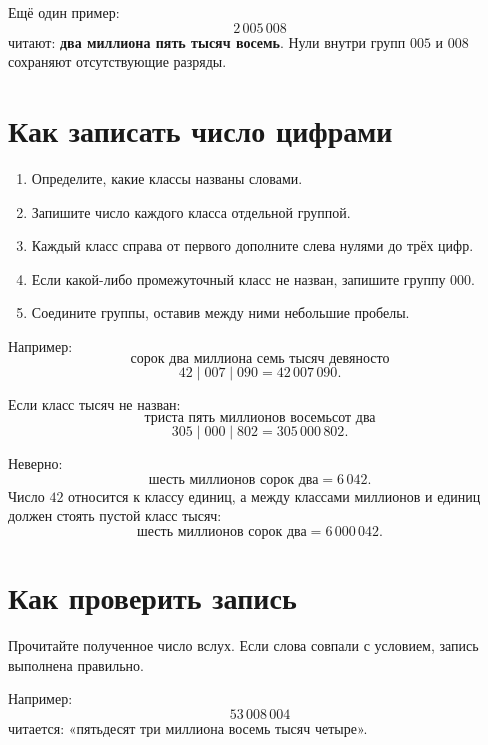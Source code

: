 Ещё один пример:
\[
  2\,005\,008
\]
читают: \textbf{два миллиона пять тысяч восемь}. Нули внутри групп
\(005\) и \(008\) сохраняют отсутствующие разряды.

\section{Как записать число цифрами}

\writingclassesfigure

\begin{conclusionbox}
  \begin{enumerate}
    \item Определите, какие классы названы словами.
    \item Запишите число каждого класса отдельной группой.
    \item Каждый класс справа от первого дополните слева нулями до трёх цифр.
    \item Если какой-либо промежуточный класс не назван, запишите группу \(000\).
    \item Соедините группы, оставив между ними небольшие пробелы.
  \end{enumerate}
\end{conclusionbox}

Например:
\[
  \text{сорок два миллиона семь тысяч девяносто}
\]
\[
  42\;|\;007\;|\;090=42\,007\,090.
\]

Если класс тысяч не назван:
\[
  \text{триста пять миллионов восемьсот два}
\]
\[
  305\;|\;000\;|\;802=305\,000\,802.
\]

\begin{warningbox}
  Неверно:
  \[
    \text{шесть миллионов сорок два}=6\,042.
  \]
  Число \(42\) относится к классу единиц, а между классами миллионов и
  единиц должен стоять пустой класс тысяч:
  \[
    \text{шесть миллионов сорок два}=6\,000\,042.
  \]
\end{warningbox}

\section{Как проверить запись}

\begin{trainingtask}
  Прочитайте полученное число вслух. Если слова совпали с условием, запись
  выполнена правильно.

  Например:
  \[
    53\,008\,004
  \]
  читается: «пятьдесят три миллиона восемь тысяч четыре».
\end{trainingtask}


